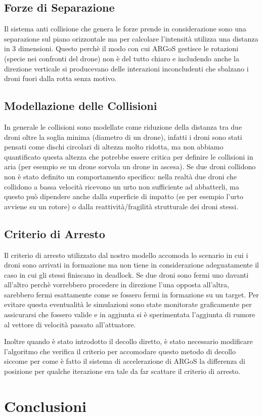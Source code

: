 \documentclass[a4paper,11pt,oneside, table]{article}
\begin{document}
\subsection{Forze di Separazione}

Il sistema anti collisione che genera le forze prende in considerazione sono una separazione sul piano orizzontale ma per calcolare l'intensit\`a utilizza una distanza in 3 dimensioni.
Questo perch\`e il modo con cui ARGoS gestisce le rotazioni (specie nei confronti del drone) non \`e del tutto chiaro e includendo anche la direzione verticale si producevano delle interazioni inconcludenti che sbalzano i droni fuori dalla rotta senza motivo.

\subsection{Modellazione delle Collisioni}

In generale le collisioni sono modellate come riduzione della distanza tra due droni oltre la soglia minima (diametro di un drone), infatti i droni sono stati pensati come dischi circolari di altezza molto ridotta, ma non abbiamo quantificato questa altezza che potrebbe essere critica per definire le collisioni in aria (per esempio se un drone sorvola un drone in ascesa).
Se due droni collidono non \`e stato definito un comportamento specifico: nella realt\`a due droni che collidono a bassa velocit\`a ricevono un urto non sufficiente ad abbatterli, ma questo pu\`o dipendere anche dalla superficie di impatto (se per esempio l'urto avviene su un rotore) o dalla reattivit\`a/fragilit\`a strutturale dei droni stessi.

\subsection{Criterio di Arresto}

Il criterio di arresto utilizzato dal nostro modello accomoda lo scenario in cui i droni sono arrivati in formazione ma non tiene in considerazione adeguatamente il caso in cui gli stessi finiscano in deadlock.
Se due droni sono fermi uno davanti all'altro perch\`e vorrebbero procedere in direzione l'una opposta all'altra, sarebbero fermi esattamente come se fossero fermi in formazione su un target.
Per evitare questa eventualit\`a le simulazioni sono state monitorate graficamente per assicurarsi che fossero valide e in aggiunta si \`e sperimentata l'aggiunta di rumore al vettore di velocit\`a passato all'attuatore.

Inoltre quando \`e stato introdotto il decollo diretto, \`e stato necessario modificare l'algoritmo che verifica il criterio per accomodare questo metodo di decollo siccome per come \`e fatto il sistema di accelerazione di ARGoS la differenza di posizione per qualche iterazione era tale da far scattare il criterio di arresto.

\section{Conclusioni}

\printbibliography[title={Bibliografia}]
\end{document}
